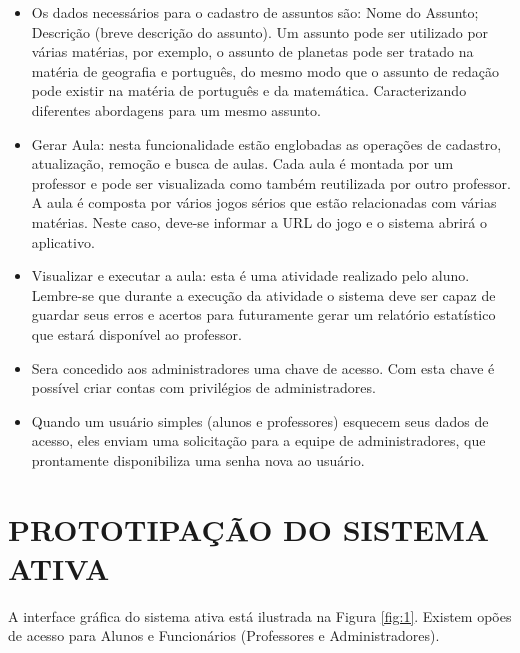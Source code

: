 \documentclass{utfpr-pg}
\begin{document}
\begin{itemize}
    \item Os dados necessários para o cadastro de assuntos são: Nome do Assunto; Descrição (breve descrição do assunto). Um assunto pode ser utilizado por várias matérias, por exemplo, o assunto de planetas pode ser tratado na matéria de geografia e português, do mesmo modo que o assunto de redação pode existir na matéria de português e da matemática. Caracterizando diferentes abordagens para um mesmo assunto.
    
    \item Gerar Aula: nesta funcionalidade estão englobadas as operações de cadastro, atualização, remoção e busca de aulas. Cada aula é montada por um professor e pode ser visualizada como também reutilizada por outro professor. A aula é composta por vários jogos sérios que estão relacionadas com várias matérias. Neste caso, deve-se informar a URL do jogo e o sistema abrirá o aplicativo. 
    
    \item Visualizar e executar a aula: esta é uma atividade realizado pelo aluno. Lembre-se que durante a execução da atividade o sistema deve ser capaz de guardar seus erros e acertos para futuramente gerar um relatório estatístico que estará disponível ao professor.
    
    \item Sera concedido aos administradores uma chave de acesso. Com esta chave é possível criar contas com privilégios de administradores.
    
    \item Quando um usuário simples (alunos e professores) esquecem seus dados de acesso, eles enviam uma solicitação para a equipe de administradores, que prontamente disponibiliza uma senha nova ao usuário.
    
\end{itemize}

\chapter{PROTOTIPAÇÃO DO SISTEMA ATIVA}
    \label{chapter:prototipacao do sitema ativa}
        A interface gráfica do sistema ativa está ilustrada na Figura \ref{fig:1}. Existem opões de acesso para Alunos e Funcionários (Professores e Administradores).
       
\end{document}
